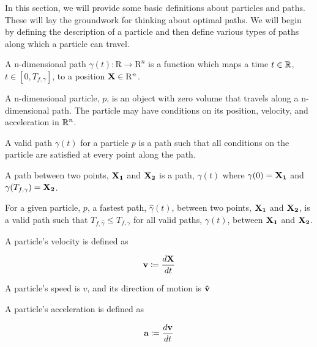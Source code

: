 In this section, we will provide some basic definitions about particles and paths. These will lay the groundwork for thinking about optimal paths. We will begin by defining the description of a particle and then define various types of paths along which a particle can travel.

\begin{definition}
A n-dimensional path $\gamma(t): \mathrm{R} \to \mathrm{R}^n$ is a function which maps a time $t \in \mathbb R$, $t \in [0, T_{f, \gamma}]$, to a position $\mathbf{X} \in \mathrm{R}^n$. 
\end{definition}

\begin{definition}
  A n-dimensional particle, $p$, is an object with zero volume that travels along a n-dimensional path. The particle may have conditions on its position, velocity, and acceleration in $\mathbb R^n$.
\end{definition}

\begin{definition}
  A valid path $\gamma(t)$ for a particle $p$ is a path such that all conditions on the particle are satisfied at every point along the path.
\end{definition}

\begin{definition}
  A path between two points, $\mathbf{X_1}$ and $\mathbf{X_2}$ is a path, $\gamma(t)$ where $\gamma(0) = \mathbf{X_1}$ and $\gamma(T_{f, \gamma}) = \mathbf{X_2}$.
\end{definition}

\begin{definition}
  For a given particle, $p$, a fastest path, $\hat{\gamma}(t)$, between two points, $\mathbf{X_1}$ and $\mathbf{X_2}$, is a valid path such that $T_{f,\hat{\gamma}} \leq T_{f,\gamma}$ for all valid paths, $\gamma(t)$, between $\mathbf{X_1}$ and $\mathbf{X_2}$.
\end{definition}

\begin{definition}
  A particle's velocity is defined as 

  \[\mathbf{v} \coloneqq \frac{d\mathbf{X}}{dt}\]

  A particle's speed is $v$, and its direction of motion is $\mathbf{\hat{v}}$

\end{definition}

\begin{definition}
  A particle's acceleration is defined as 
  
  \[\mathbf{a} \coloneqq \frac{d\mathbf{v}}{dt}\]
\end{definition}

